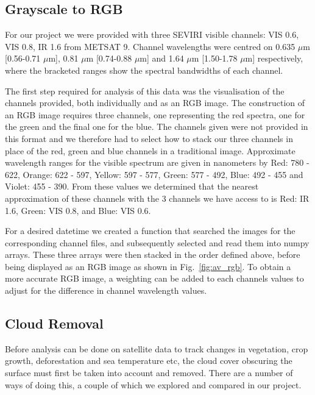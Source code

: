 \subsection{Grayscale to RGB}
For our project we were provided with three SEVIRI visible channels: VIS 0.6, VIS 0.8, IR 1.6 \cite{kitdoc}
from METSAT 9. Channel wavelengths were centred on 0.635 $\mu$m [0.56-0.71 $\mu$m], 0.81 $\mu$m [0.74-0.88 $\mu$m] and 1.64 $\mu$m [1.50-1.78 $\mu$m] respectively, where the bracketed ranges show the spectral bandwidths of each channel. 
\par The first step required for analysis of this data was the visualisation of the channels provided, both individually and as an RGB image. The construction of an RGB image requires three channels, one representing the red spectra, one for the green and the final one for the blue. The channels given were not provided in this format and we therefore had to select how to stack our three channels in place of the red, green and blue channels in a traditional image. Approximate wavelength ranges for the visible spectrum are given in nanometers by Red: 780 - 622, Orange: 622 - 597, Yellow: 597 - 577, Green: 577 - 492, Blue: 492 - 455 and Violet: 455 - 390. %
From these values we determined that the nearest approximation of these channels with the 3 channels we have access to is Red: IR 1.6, Green: VIS 0.8, and Blue: VIS 0.6. 
\par For a desired datetime we created a function that searched the images for the corresponding channel files, and subsequently selected and read them into numpy arrays. These three arrays were then stacked in the order defined above, before being displayed as an RGB image as shown in Fig.~\ref{fig:av_rgb}. To obtain a more accurate RGB image, a weighting can be added to each channels values to adjust for the difference in channel wavelength values. 
\subsection{Cloud Removal}
 Before analysis can be done on satellite data to track changes in vegetation, crop growth, deforestation and sea temperature etc, the cloud cover obscuring the surface must first be taken into account and removed. There are a number of ways of doing this, a couple of which we explored and compared in our project. 
